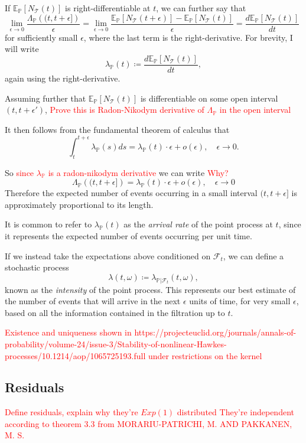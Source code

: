 \documentclass[honours,12pt]{unswthesis}
\numberwithin{equation}{section}
\begin{document}
If $\mathbb{E}_\mathbb{P}\left[N_\mathcal{T}(t)\right]$ is right-differentiable at $t$, we can further say that
$$\lim_{\epsilon\to0}\frac{\Lambda_\mathbb{P}\left((t,t+\epsilon]\right)}{\epsilon} = \lim_{\epsilon\to0}\frac{\mathbb{E}_\mathbb{P}\left[N_\mathcal{T}(t+\epsilon)\right] - \mathbb{E}_\mathbb{P}\left[N_\mathcal{T}(t)\right]}{\epsilon} = \frac{d\mathbb{E}_\mathbb{P}\left[N_\mathcal{T}(t)\right]}{dt}$$
for sufficiently small $\epsilon$, where the last term is the right-derivative. For brevity, I will write
$$\lambda_{\mathbb{P}}(t) \coloneq \frac{d\mathbb{E}_\mathbb{P}\left[N_\mathcal{T}(t)\right]}{dt},$$
again using the right-derivative.

Assuming further that $\mathbb{E}_\mathbb{P}\left[N_\mathcal{T}(t)\right]$ is differentiable on some open interval $(t,t+\epsilon')$, \textcolor{red}{Prove this is Radon-Nikodym derivative of $\Lambda_\mathbb{P}$ in the open interval}

It then follows from the fundamental theorem of calculus that
$$\int_t^{t+\epsilon} \lambda_{\mathbb{P}}(s)ds = \lambda_{\mathbb{P}}(t)\cdot\epsilon + o(\epsilon),\quad \epsilon\to 0.$$

So \textcolor{red}{since $\lambda_\mathbb{P}$ is a radon-nikodym derivative} we can write \textcolor{red}{Why?}
$$\Lambda_{\mathbb{P}}\left((t,t+\epsilon]\right)=\lambda_{\mathbb{P}}(t)\cdot\epsilon+o(\epsilon),\quad \epsilon\to 0$$
Therefore the expected number of events occurring in a small interval $(t,t+\epsilon]$ is approximately proportional to its length.

It is common to refer to $\lambda_{\mathbb{P}}(t)$ as the \textit{arrival rate} of the point process at $t$, since it represents the expected number of events occurring per unit time.

If we instead take the expectations above conditioned on $\mathcal{F}_t$, we can define a stochastic process
$$\lambda(t,\omega) \coloneq \lambda_{\mathbb{P}\vert\mathcal{F}_t}(t,\omega),$$
known as the \textit{intensity} of the point process. This represents our best estimate of the number of events that will arrive in the next $\epsilon$ units of time, for very small $\epsilon$, based on all the information contained in the filtration up to $t$.

\textcolor{red}{Existence and uniqueness shown in https://projecteuclid.org/journals/annals-of-probability/volume-24/issue-3/Stability-of-nonlinear-Hawkes-processes/10.1214/aop/1065725193.full under restrictions on the kernel}

\subsection{Residuals}
\textcolor{red}{Define residuals, explain why they're $Exp(1)$ distributed}
\textcolor{red}{They're independent according to theorem 3.3 from MORARIU-PATRICHI, M. AND PAKKANEN, M. S.}
\end{document}
